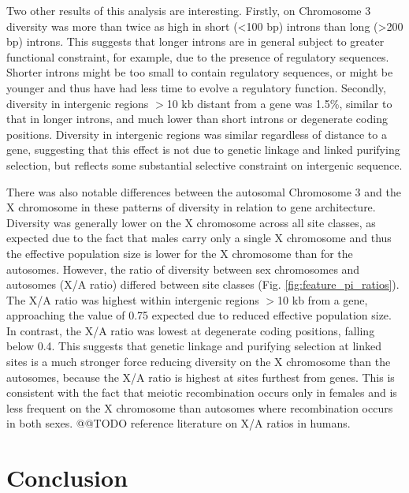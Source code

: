 \documentclass[a4paper,11pt,abstracton,hidelinks]{scrartcl}
\begin{document}
Two other results of this analysis are interesting.
%
Firstly, on Chromosome 3 diversity was more than twice as high in short (<100 bp) introns than long (>200 bp) introns.
%
This suggests that longer introns are in general subject to greater functional constraint, for example, due to the presence of regulatory sequences.
%
Shorter introns might be too small to contain regulatory sequences, or might be younger and thus have had less time to evolve a regulatory function.
%
Secondly, diversity in intergenic regions $>$10 kb distant from a gene was 1.5\%, similar to that in longer introns, and much lower than short introns or degenerate coding positions.
%
Diversity in intergenic regions was similar regardless of distance to a gene, suggesting that this effect is not due to genetic linkage and linked purifying selection, but reflects some substantial selective constraint on intergenic sequence.


There was also notable differences between the autosomal Chromosome 3 and the X chromosome in these patterns of diversity in relation to gene architecture.
%
Diversity was generally lower on the X chromosome across all site classes, as expected due to the fact that males carry only a single X chromosome and thus the effective population size is lower for the X chromosome than for the autosomes.
%
However, the ratio of diversity between sex chromosomes and autosomes (X/A ratio) differed between site classes (Fig. \ref{fig:feature_pi_ratios}).
%
The X/A ratio was highest within intergenic regions $>$10 kb from a gene, approaching the value of 0.75 expected due to reduced effective population size.
%
In contrast, the X/A ratio was lowest at degenerate coding positions, falling below 0.4.
%
This suggests that genetic linkage and purifying selection at linked sites is a much stronger force reducing diversity on the X chromosome than the autosomes, because the X/A ratio is highest at sites furthest from genes.
%
This is consistent with the fact that meiotic recombination occurs only in females and is less frequent on the X chromosome than autosomes where recombination occurs in both sexes.
%
@@TODO reference literature on X/A ratios in humans.


\section{Conclusion}
\end{document}
